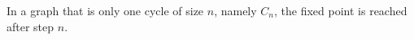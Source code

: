 \documentclass[a4paper]{article}
\begin{document}
\begin{itemize}
	In a graph that is only one cycle of size $n$, namely $C_n$, the fixed point is reached after step $n$.
	
\end{itemize}
\end{document}
